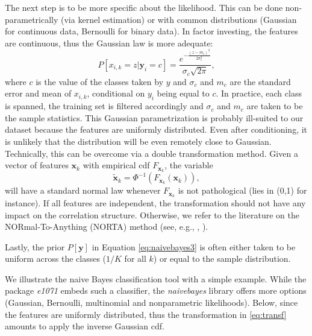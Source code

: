 \documentclass[]{krantz}
\theoremstyle{definition}
\theoremstyle{definition}
\theoremstyle{definition}
\theoremstyle{remark}
\begin{document}
The next step is to be more specific about the likelihood. This can be
done non-parametrically (via kernel estimation) or with common
distributions (Gaussian for continuous data, Bernoulli for binary data).
In factor investing, the features are continuous, thus the Gaussian law
is more adequate:
\[P[x_{i,k}=z|\textbf{y}_i= c]=\frac{e^{-\frac{(z-m_c)^2}{2\sigma_c^2}}}{\sigma_c\sqrt{2\pi}},\]
where \(c\) is the value of the classes taken by \(y\) and \(\sigma_c\)
and \(m_c\) are the standard error and mean of \(x_{i,k}\), conditional
on \(y_i\) being equal to \(c\). In practice, each class is spanned, the
training set is filtered accordingly and \(\sigma_c\) and \(m_c\) are
taken to be the sample statistics. This Gaussian parametrization is
probably ill-suited to our dataset because the features are uniformly
distributed. Even after conditioning, it is unlikely that the
distribution will be even remotely close to Gaussian. Technically, this
can be overcome via a double transformation method. Given a vector of
features \(\textbf{x}_k\) with empirical cdf \(F_{\textbf{x}_k}\), the
variable \begin{equation}
\label{eq:transf}
\tilde{\textbf{x}}_k=\Phi^{-1}\left(F_{\textbf{x}_k}(\textbf{x}_k) \right),
\end{equation} will have a standard normal law whenever
\(F_{\textbf{x}_k}\) is not pathological (lies in (0,1) for instance).
If all features are independent, the transformation should not have any
impact on the correlation structure. Otherwise, we refer to the
literature on the NORmal-To-Anything (NORTA) method (see, e.g.,
\citet{chen2001initialization}, \citet{coqueret2017approximate}).

Lastly, the prior \(P[\textbf{y}]\) in Equation \eqref{eq:naivebayes3} is
often either taken to be uniform across the classes (\(1/K\) for all
\(k\)) or equal to the sample distribution.

We illustrate the naive Bayes classification tool with a simple example.
While the package \emph{e1071} embeds such a classifier, the
\emph{naivebayes} library offers more options (Gaussian, Bernoulli,
multinomial and nonparametric likelihoods). Below, since the features
are uniformly distributed, thus the transformation in \eqref{eq:transf}
amounts to apply the inverse Gaussian cdf.

\footnotesize
\end{document}
